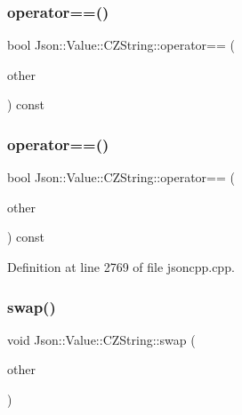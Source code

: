 \subsubsection{\texorpdfstring{operator==()}{operator==()}\hspace{0.1cm}{\footnotesize\ttfamily [1/2]}}
{\footnotesize\ttfamily bool Json\+::\+Value\+::\+C\+Z\+String\+::operator== (\begin{DoxyParamCaption}\item[{\hyperlink{class_json_1_1_value_1_1_c_z_string}{C\+Z\+String} const \&}]{other }\end{DoxyParamCaption}) const}

\hypertarget{class_json_1_1_value_1_1_c_z_string_ad41766c98fc6a6d5fcd72aaf78fc5db0}{}\label{class_json_1_1_value_1_1_c_z_string_ad41766c98fc6a6d5fcd72aaf78fc5db0} 
\subsubsection{\texorpdfstring{operator==()}{operator==()}\hspace{0.1cm}{\footnotesize\ttfamily [2/2]}}
{\footnotesize\ttfamily bool Json\+::\+Value\+::\+C\+Z\+String\+::operator== (\begin{DoxyParamCaption}\item[{\hyperlink{class_json_1_1_value_1_1_c_z_string}{C\+Z\+String} const \&}]{other }\end{DoxyParamCaption}) const}



Definition at line 2769 of file jsoncpp.\+cpp.

\hypertarget{class_json_1_1_value_1_1_c_z_string_ad59f3542d2eea749a6a63409d1a02207}{}\label{class_json_1_1_value_1_1_c_z_string_ad59f3542d2eea749a6a63409d1a02207} 
\subsubsection{\texorpdfstring{swap()}{swap()}\hspace{0.1cm}{\footnotesize\ttfamily [1/2]}}
{\footnotesize\ttfamily void Json\+::\+Value\+::\+C\+Z\+String\+::swap (\begin{DoxyParamCaption}\item[{\hyperlink{class_json_1_1_value_1_1_c_z_string}{C\+Z\+String} \&}]{other }\end{DoxyParamCaption})\hspace{0.3cm}{\ttfamily [private]}}

